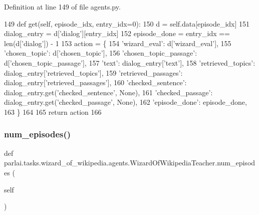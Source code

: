 Definition at line 149 of file agents.\+py.


\begin{DoxyCode}
149     \textcolor{keyword}{def }get(self, episode\_idx, entry\_idx=0):
150         d = self.data[episode\_idx]
151         dialog\_entry = d[\textcolor{stringliteral}{'dialog'}][entry\_idx]
152         episode\_done = entry\_idx == len(d[\textcolor{stringliteral}{'dialog'}]) - 1
153         action = \{
154             \textcolor{stringliteral}{'wizard\_eval'}: d[\textcolor{stringliteral}{'wizard\_eval'}],
155             \textcolor{stringliteral}{'chosen\_topic'}: d[\textcolor{stringliteral}{'chosen\_topic'}],
156             \textcolor{stringliteral}{'chosen\_topic\_passage'}: d[\textcolor{stringliteral}{'chosen\_topic\_passage'}],
157             \textcolor{stringliteral}{'text'}: dialog\_entry[\textcolor{stringliteral}{'text'}],
158             \textcolor{stringliteral}{'retrieved\_topics'}: dialog\_entry[\textcolor{stringliteral}{'retrieved\_topics'}],
159             \textcolor{stringliteral}{'retrieved\_passages'}: dialog\_entry[\textcolor{stringliteral}{'retrieved\_passages'}],
160             \textcolor{stringliteral}{'checked\_sentence'}: dialog\_entry.get(\textcolor{stringliteral}{'checked\_sentence'}, \textcolor{keywordtype}{None}),
161             \textcolor{stringliteral}{'checked\_passage'}: dialog\_entry.get(\textcolor{stringliteral}{'checked\_passage'}, \textcolor{keywordtype}{None}),
162             \textcolor{stringliteral}{'episode\_done'}: episode\_done,
163         \}
164 
165         \textcolor{keywordflow}{return} action
166 
\end{DoxyCode}
\mbox{\label{classparlai_1_1tasks_1_1wizard__of__wikipedia_1_1agents_1_1WizardOfWikipediaTeacher_aaf24cfe4f6e58a7d9d8bda076759f76d}} 
\subsubsection{\texorpdfstring{num\+\_\+episodes()}{num\_episodes()}}
{\footnotesize\ttfamily def parlai.\+tasks.\+wizard\+\_\+of\+\_\+wikipedia.\+agents.\+Wizard\+Of\+Wikipedia\+Teacher.\+num\+\_\+episodes (\begin{DoxyParamCaption}\item[{}]{self }\end{DoxyParamCaption})}




